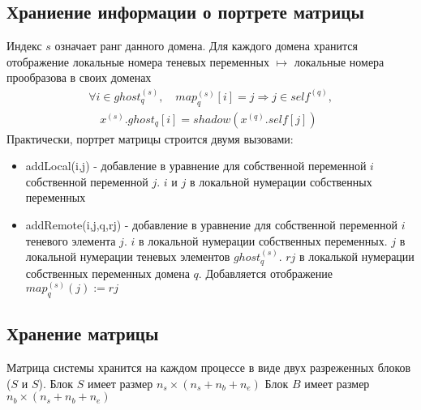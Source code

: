 \documentclass[12pt]{article}
\begin{document}
\subsection{Храниение информации о портрете матрицы}
Индекс $s$ означает ранг данного домена.
Для каждого домена хранится
отображение локальные номера теневых переменных $\mapsto$
локальные номера прообразова в своих доменах
\begin{align*}
\forall i \in ghost^{(s)}_q, \quad map^{(s)}_q[i] = j \Rightarrow 
j \in self^{(q)},\\ \quad x^{(s)}.ghost_q[i] = shadow(x^{(q)}.self[j])
\end{align*}
Практически, портрет матрицы строится двумя вызовами:
\begin{itemize}
\item \textsf{addLocal(i,j)} - добавление в уравнение для собственной переменной
$i$ собственной переменной $j$. $i$ и $j$
в локальной нумерации собственных переменных
\item \textsf{addRemote(i,j,q,rj)} - добавление в уравнение для собственной
переменной $i$ теневого элемента $j$. $i$ в локальной нумерации собственных
переменных. $j$ в локальной нумерации теневых элементов $ghost^{(s)}_q$. $rj$ в
локалькой нумерации собственных переменных домена $q$. Добавляется отображение
$map^{(s)}_q(j) := rj$
\end{itemize}

\subsection{Хранение матрицы}
Матрица системы хранится на каждом процессе в виде двух разреженных блоков ($S$ и
$S$). Блок $S$ имеет размер $n_s \times (n_s + n_b + n_e)$
Блок $B$ имеет размер $n_b \times (n_s + n_b + n_e)$
\end{document}
